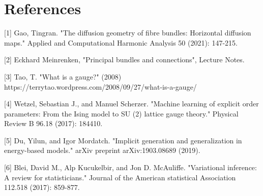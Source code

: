 \documentclass{article}
\begin{document}
\section*{References}

\small

[1] Gao, Tingran. "The diffusion geometry of fibre bundles: Horizontal diffusion maps." Applied and Computational Harmonic Analysis 50 (2021): 147-215.

[2] Eckhard Meinrenken, "Principal bundles and connections", Lecture Notes. 

[3] Tao, T. "What is a gauge?" (2008) https://terrytao.wordpress.com/2008/09/27/what-is-a-gauge/

[4] Wetzel, Sebastian J., and Manuel Scherzer. "Machine learning of explicit order parameters: From the Ising model to SU (2) lattice gauge theory." Physical Review B 96.18 (2017): 184410.


[5] Du, Yilun, and Igor Mordatch. "Implicit generation and generalization in energy-based models." arXiv preprint arXiv:1903.08689 (2019).

[6] Blei, David M., Alp Kucukelbir, and Jon D. McAuliffe. "Variational inference: A review for statisticians." Journal of the American statistical Association 112.518 (2017): 859-877.





\end{document}
